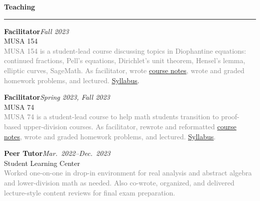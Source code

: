 \documentclass{article}
\renewcommand{\section}[1]{{\color{headercolor}\LARGE
    \textbf{#1\phantom{p}}\hrule}}
\newcommand{\entry}[5]{{\large\textbf{#1}}\hfill\textit{#3}\\
    #2\hfill\\
    \textcolor{gray}{#5}}
\newcommand{\award}[3]{{\large\textbf{#1}}\hfill\textit{#2}\\
    \textcolor{gray}{#3}}
\begin{document}



\newpage

\addtolength{\topmargin}{0.8in}
\vspace{10em}


\section{Teaching}

\entry{Facilitator}{MUSA 154}{Fall 2023}{}
{MUSA 154 is a student-lead course discussing topics in Diophantine equations: continued fractions, Pell's equations, Dirichlet's unit theorem, Hensel's lemma, elliptic curves, SageMath. As facilitator, wrote \underline{\href{https://dfoiler.github.io/notes/154/notes.pdf}{course notes}}, wrote and graded homework problems, and lectured. \href{https://drive.google.com/file/d/1rFrRkBsHJudkTDIoJZ76rk3sxnTt2ntE/view}{\underline{Syllabus}}}.

\entry{Facilitator}{MUSA 74}{Spring 2023, Fall 2023}{}
{MUSA 74 is a student-lead course to help math students transition to proof-based upper-division courses. As facilitator, rewrote and reformatted \underline{\href{https://musa-berk.github.io/MUSA-74/notes.pdf}{course notes}}, wrote and graded homework problems, and lectured. \href{https://musa-berk.github.io/MUSA-74/syllabus.pdf}{\underline{Syllabus}}.}

\entry{Peer Tutor}{Student Learning Center}{Mar.~2022--Dec.~2023}{4 hours/week}
{Worked one-on-one in drop-in environment for real analysis and abstract algebra and lower-division math as needed. Also co-wrote, organized, and delivered lecture-style content reviews for final exam preparation.}


\iffalse
    \entry{Peer Tutor}{LASA Math Department}{Sept.~2018--Present}{3 hours/week}
    {Formed relationships while tutoring one-on-one Precalculus, Linear Algebra, and Logic. Conveyed some metamathematics.}
\fi
\end{document}

